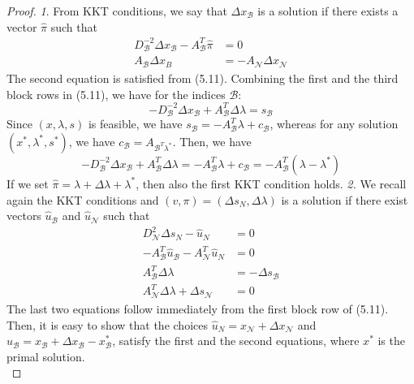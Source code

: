 \documentclass[a4paper,10 pt,titlepage,twoside]{book}
\theoremstyle{plain}
\theoremstyle{definition}
\theoremstyle{remark}
\begin{document}
\begin{proof}
	\textit{1}. From KKT conditions, we say that $\Delta x_{\mathcal{B}}$ is a solution if there exists a vector $\hat{\pi}$ such that
	\begin{align*}
	D_{\mathcal{B}}^{-2}\Delta x_{\mathcal{B}}-A_{\mathcal{B}}^{T}\hat{\pi}&= 0\\
	A_{\mathcal{B}}\Delta x_{B}&= -A_{\mathcal{N}}\Delta x_{\mathcal{N}}
	\end{align*}
	The second equation is satisfied from (5.11). Combining the first and the third block rows in (5.11), we have for the indices $\mathcal{B}$:
	\begin{equation*}
	-D_{\mathcal{B}}^{-2}\Delta x_{\mathcal{B}} + A_{\mathcal{B}}^{T}\Delta \lambda = s_{\mathcal{B}}
	\end{equation*}
	Since $(x, \lambda, s)$ is feasible, we have $s_{\mathcal{B}}= -A_{\mathcal{B}}^{T}\lambda+ c_{\mathcal{B}}$, whereas for any solution $(x^{*}, \lambda^{*}, s^{*})$, we have $c_{\mathcal{B}}= A_{\mathcal{B}^{T}\lambda^{*}}$. Then, we have
	\begin{equation*}
	-D_{\mathcal{B}}^{-2}\Delta x_{\mathcal{B}} + A_{\mathcal{B}}^{T}\Delta \lambda = -A_{\mathcal{B}}^{T}\lambda+ c_{\mathcal{B}} = -A_{\mathcal{B}}^{T}(\lambda - \lambda^{*}) 
	\end{equation*}
	If we set $\hat{\pi} = \lambda + \Delta\lambda + \lambda^{*}$, then also the first KKT condition holds.\newline
	 \textit{2.} We recall again the KKT conditions and $(v,\pi)=(\Delta s_{N},\Delta\lambda)$ is a solution if there exist vectors $\hat{u}_{\mathcal{B}}$ and $\hat{u}_{\mathcal{N}}$ such that
	 \begin{align*}
	 D_{\mathcal{N}}^{2}\Delta s_{N}-\hat{u}_{N}&=0\\
	 -A_{\mathcal{B}}^{T}\hat{u}_{\mathcal{B}}-A_{\mathcal{N}}^{T}\hat{u}_{N}&=0\\
	 A_{\mathcal{B}}^{T}\Delta \lambda &= -\Delta s_{\mathcal{B}}\\
	 A_{\mathcal{N}}^{T}\Delta\lambda + \Delta s_{\mathcal{N}} &=0 
	 \end{align*}
	 The last two equations follow immediately from the first block row of (5.11).\\
	 Then, it is easy to show that the choices $\hat{u}_{N}= x_{\mathcal{N}}+\Delta x_{\mathcal{N}}$ and $\hat{u}_{\mathcal{B}}=x_{\mathcal{B}}+\Delta x_{\mathcal{B}}-x_{\mathcal{B}}^{*}$, satisfy the first and the second equations, where $x^{*}$ is the primal solution.\\

\end{proof}
\end{document}
